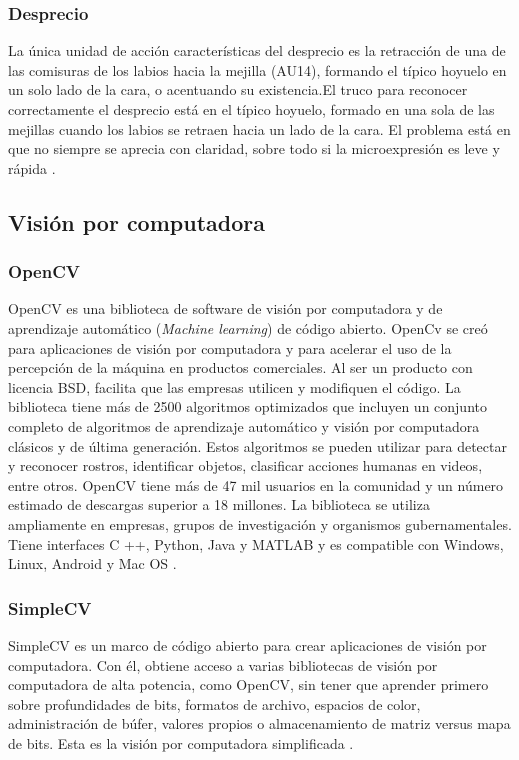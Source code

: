 \subsubsection*{Desprecio}
La única unidad de acción características del desprecio es la retracción de una de las comisuras de los labios hacia la mejilla (AU14), formando el típico hoyuelo en un solo lado de la cara, o acentuando su existencia.El truco para reconocer correctamente el desprecio está en el típico hoyuelo, formado en una sola de las mejillas cuando los labios se retraen hacia un lado de la cara. El problema está en que no siempre se aprecia con claridad, sobre todo si la microexpresión es leve y rápida \cite{ReconocerLasEmociones}.

\subsection*{Visión por computadora}
\subsubsection*{OpenCV}
OpenCV es una biblioteca de software de visión por computadora y de aprendizaje automático (\textit{Machine learning}) de código abierto. OpenCv se creó para aplicaciones de visión por computadora y para acelerar el uso de la percepción de la máquina en productos comerciales. Al ser un producto con licencia BSD, facilita que las empresas utilicen y modifiquen el código. La biblioteca tiene más de 2500 algoritmos optimizados que incluyen un conjunto completo de algoritmos de aprendizaje automático y visión por computadora clásicos y de última generación. Estos algoritmos se pueden utilizar para detectar y reconocer rostros, identificar objetos, clasificar acciones humanas en videos, entre otros. OpenCV tiene más de 47 mil usuarios en la comunidad y un número estimado de descargas superior a 18 millones. La biblioteca se utiliza ampliamente en empresas, grupos de investigación y organismos gubernamentales. Tiene interfaces C ++, Python, Java y MATLAB y es compatible con Windows, Linux, Android y Mac OS \cite{OpenCV}.

\subsubsection*{SimpleCV}
SimpleCV es un marco de código abierto para crear aplicaciones de visión por computadora. Con él, obtiene acceso a varias bibliotecas de visión por computadora de alta potencia, como OpenCV, sin tener que aprender primero sobre profundidades de bits, formatos de archivo, espacios de color, administración de búfer, valores propios o almacenamiento de matriz versus mapa de bits. Esta es la visión por computadora simplificada \cite{SimpleCV}.

